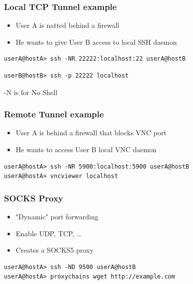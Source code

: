 \begin{frame}[fragile]
\frametitle{Local TCP Tunnel example}
\begin{itemize}
\item User A is natted behind a firewall
\item He wants to give User B access to local SSH daemon
\end{itemize}
\begin{lstlisting}
userA@hostA> ssh -NR 22222:localhost:22 userA@hostB
\end{lstlisting}
\begin{lstlisting}
userB@hostB> ssh -p 22222 localhost
\end{lstlisting}
\begin{center}-N is for No Shell\end{center}

\end{frame}
\begin{frame}[fragile]
\frametitle{Remote Tunnel example}
\begin{itemize}
\item User A is behind a firewall that blocks VNC port
\item He wants to access User B local VNC daemon
\end{itemize}
\begin{lstlisting}
userA@hostA> ssh -NR 5900:localhost:5900 userA@hostB
userA@hostA> vncviewer localhost
\end{lstlisting}

\end{frame}
\begin{frame}[fragile]
\frametitle{SOCKS Proxy}
\begin{itemize}
\item "Dynamic" port forwarding
\item Enable UDP, TCP, \dots
\item Creates a SOCKS5 proxy
\end{itemize}
\begin{lstlisting}
userA@hostA> ssh -ND 9500 userA@hostB
userA@hostA> proxychains wget http://example.com
\end{lstlisting}

\end{frame}


